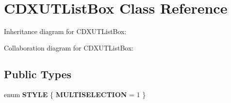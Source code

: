\hypertarget{class_c_d_x_u_t_list_box}{\section{C\+D\+X\+U\+T\+List\+Box Class Reference}
\label{class_c_d_x_u_t_list_box}
}


Inheritance diagram for C\+D\+X\+U\+T\+List\+Box\+:


Collaboration diagram for C\+D\+X\+U\+T\+List\+Box\+:
\subsection*{Public Types}
\begin{DoxyCompactItemize}
\item 
\hypertarget{class_c_d_x_u_t_list_box_a92ad351d00e5669e6663418d1e959692}{enum {\bfseries S\+T\+Y\+L\+E} \{ {\bfseries M\+U\+L\+T\+I\+S\+E\+L\+E\+C\+T\+I\+O\+N} = 1
 \}}\label{class_c_d_x_u_t_list_box_a92ad351d00e5669e6663418d1e959692}

\end{DoxyCompactItemize}
